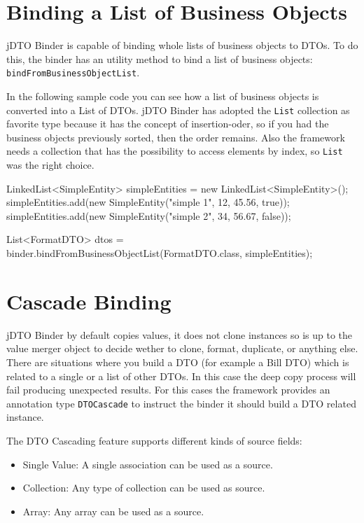 \documentclass[11pt]{article}
\newcommand{\JDTO}{jDTO Binder\xspace}
\begin{document}
\section{Binding a List of Business Objects}


\JDTO is capable of binding whole lists of business objects to DTOs. To do this, the binder has an utility method to bind a list of business objects: \texttt{bindFromBusinessObjectList}.

In the following sample code you can see how a list of business objects is converted into a List of DTOs. \JDTO has adopted the \texttt{List} collection as favorite type because it has the concept of insertion-oder, so if you had the business objects previously sorted, then the order remains. Also the framework needs a collection that has the possibility to access elements by index, so \texttt{List} was the right choice.


\begin{java}
LinkedList<SimpleEntity> simpleEntities = 
    new LinkedList<SimpleEntity>();
simpleEntities.add(new SimpleEntity("simple 1", 12, 45.56, true));
simpleEntities.add(new SimpleEntity("simple 2", 34, 56.67, false));

List<FormatDTO> dtos = binder.bindFromBusinessObjectList(FormatDTO.class, simpleEntities);
\end{java}


\section{Cascade Binding}


\JDTO by default copies values, it does not clone instances so is up to the value merger object to decide wether to clone, format, duplicate, or anything else. 
There are situations where you build a DTO (for example a Bill DTO) which is related to a single or a list of other DTOs. In this case the deep copy process will fail producing unexpected results. For this cases the framework provides an annotation type \texttt{DTOCascade} to instruct the binder it should build a DTO related instance.

The DTO Cascading feature supports different kinds of source fields:

\begin{itemize}
\item Single Value: A single association can be used as a source.
\item Collection: Any type of collection can be used as source.
\item Array: Any array can be used as a source. 
\end{itemize}
\end{document}
